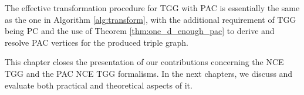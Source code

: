 The effective transformation procedure for TGG with PAC is essentially the same as the one in Algorithm \ref{alg:transform}, with the additional requirement of TGG being PC and the use of Theorem \ref{thm:one_d_enough_pac} to derive and resolve PAC vertices for the produced triple graph.

This chapter closes the presentation of our contributions concerning the NCE TGG and the PAC NCE TGG formalisms. In the next chapters, we discuss and evaluate both practical and theoretical aspects of it.